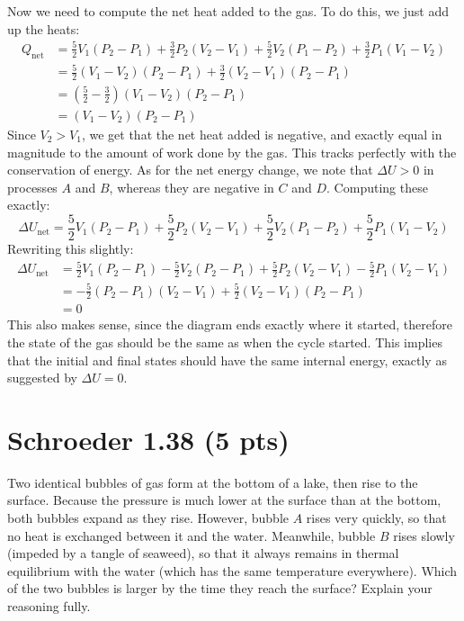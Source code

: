 \documentclass[11pt]{article}
\begin{document}
\begin{enumerate}[label=\alph*)]
\begin{solution}
				Now we need to compute the net heat added to the gas. To do this, we just add up the heats:
				\begin{align*}
					Q_{\text{net}} &= \frac{5}{2}V_1(P_2 - P_1) + \frac{3}{2}P_2(V_2 - V_1) + 
					\frac{5}{2}V_2(P_1 - P_2) + \frac{3}{2}P_1(V_1 - V_2)\\
					&= \frac{5}{2}(V_1 - V_2)(P_2 - P_1) + \frac{3}{2}(V_2 - V_1)(P_2 - P_1) \\
					&= \left( \frac{5}{2} - \frac{3}{2} \right) (V_1 - V_2)(P_2 - P_1) \\
					&= (V_1 - V_2)(P_2 - P_1) 
				\end{align*} 
				Since $V_2 > V_1$, we get that the net heat added is negative, and exactly equal in magnitude
				to the amount of work done by the gas. This tracks perfectly with the conservation of energy. 
				As for the net energy change, we note that $\Delta U > 0$ in processes $A$ and $B$, whereas 
				they are negative in $C$ and $D$. Computing these exactly:
				\[
					\Delta U_{\text{net}} = \frac{5}{2}V_1(P_2 - P_1) + \frac{5}{2}P_2(V_2 - V_1) + \frac{5}{2}
					V_2(P_1 - P_2) + \frac{5}{2}P_1(V_1 - V_2)
				\] 
				Rewriting this slightly:
				\begin{align*}
					\Delta U_{\text{net}} &= \frac{5}{2}V_1(P_2 - P_1) - \frac{5}{2}V_2(P_2 - P_1) + 
					\frac{5}{2}P_2(V_2 - V_1) - \frac{5}{2}P_1(V_2 - V_1)\\
					&= -\frac{5}{2}(P_2 - P_1)(V_2 - V_1) + \frac{5}{2}(V_2 - V_1)(P_2 - P_1) \\
					&= 0 
				\end{align*} 
				This also makes sense, since the diagram ends exactly where it started, therefore the state 
				of the gas should be the same as when the cycle started. This implies that the initial and final
				states should have the same internal energy, exactly as suggested by $\Delta U = 0$.
			\end{solution}
	\end{enumerate}
	\pagebreak
	\section*{Schroeder 1.38 (5 pts)}
	Two identical bubbles of gas form at the bottom of a lake, then rise to the surface. Because the pressure
	is much lower at the surface than at the bottom, both bubbles expand as they rise. However, bubble $A$ 
	rises very quickly, so that no heat is exchanged between it and the water. Meanwhile, bubble $B$ rises 
	slowly (impeded by a tangle of seaweed), so that it always remains in thermal equilibrium with the water 
	(which has the same temperature everywhere). Which of the two bubbles is larger by the time they reach the 
	surface? Explain your reasoning fully.
\end{document}
